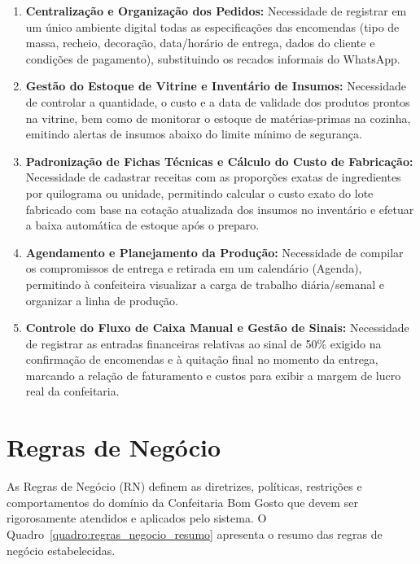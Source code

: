 \begin{enumerate}
    \item \textbf{Centralização e Organização dos Pedidos:}  Necessidade de registrar em um único ambiente digital todas as especificações das encomendas (tipo de massa, recheio, decoração, data/horário de entrega, dados do cliente e condições de pagamento), substituindo os recados informais do WhatsApp.
    \item \textbf{Gestão do Estoque de Vitrine e Inventário de Insumos:} Necessidade de controlar a quantidade, o custo e a data de validade dos produtos prontos na vitrine, bem como de monitorar o estoque de matérias-primas na cozinha, emitindo alertas de insumos abaixo do limite mínimo de segurança.
    \item \textbf{Padronização de Fichas Técnicas e Cálculo do Custo de Fabricação:} Necessidade de cadastrar receitas com as proporções exatas de ingredientes por quilograma ou unidade, permitindo calcular o custo exato do lote fabricado com base na cotação atualizada dos insumos no inventário e efetuar a baixa automática de estoque após o preparo.
    \item \textbf{Agendamento e Planejamento da Produção:} Necessidade de compilar os compromissos de entrega e retirada em um calendário (Agenda), permitindo à confeiteira visualizar a carga de trabalho diária/semanal e organizar a linha de produção.
    \item \textbf{Controle do Fluxo de Caixa Manual e Gestão de Sinais:} Necessidade de registrar as entradas financeiras relativas ao sinal de 50\% exigido na confirmação de encomendas e à quitação final no momento da entrega, marcando a relação de  faturamento e custos para exibir a margem de lucro real da confeitaria.
\end{enumerate}

\section{Regras de Negócio}
As Regras de Negócio (RN) definem as diretrizes, políticas, restrições e comportamentos do domínio da Confeitaria Bom Gosto que devem ser rigorosamente atendidos e aplicados pelo sistema. O Quadro~\ref{quadro:regras_negocio_resumo} apresenta o resumo das regras de negócio estabelecidas.

